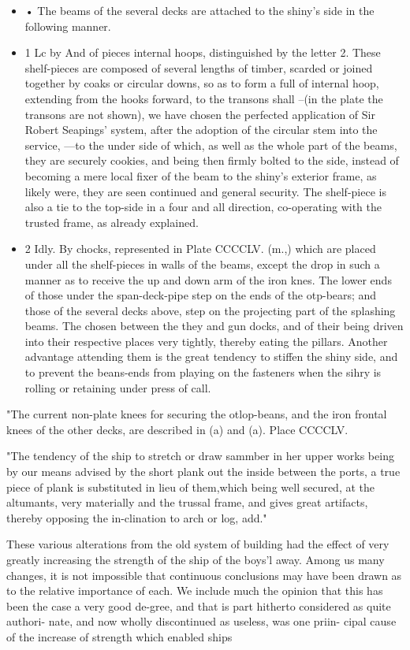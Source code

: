 \documentclass{article}
\begin{document}
\begin{itemize}
\item • The beams of the several decks are attached to the shiny’s side in the following manner.
\item 1 Lc by And of pieces internal hoops, distinguished by the letter 2. These shelf-pieces are composed of several lengths of timber, scarded or joined together by coaks or circular downs, so as to form a full of internal hoop, extending from the hooks forward, to the transons shall --(in the plate the transons are not shown), we have chosen the perfected application of Sir Robert Seapings’ system, after the adoption of the circular stem into the service, —to the under side of which, as well as the whole part of the beams, they are securely cookies, and being then firmly bolted to the side, instead of becoming a mere local fixer of the beam to the shiny’s exterior frame, as likely were, they are seen continued and general security. The shelf-piece is also a tie to the top-side in a four and all direction, co-operating with the trusted frame, as already explained.
\item 2 Idly. By chocks, represented in Plate CCCCLV. (m.,) which are placed under all the shelf-pieces in walls of the beams, except the drop in such a manner as to receive the up and down arm of the iron knes. The lower ends of those under the span-deck-pipe step on the ends of the otp-bears; and those of the several decks above, step on the projecting part of the splashing beams. The chosen between the they and gun docks, and of their being driven into their respective places very tightly, thereby eating the pillars. Another advantage attending them is the great tendency to stiffen the shiny side, and to prevent the beans-ends from playing on the fasteners when the sihry is rolling or retaining under press of call.
\end{itemize}
"The current non-plate knees for securing the otlop-beans, and the iron frontal knees of the other decks, are described in (a) and (a). Place CCCCLV.

"The tendency of the ship to stretch or draw sammber in her upper works being by our means advised by the short plank out the inside between the ports, a true piece of plank is substituted in lieu of them,which being well secured, at the altumants, very materially and the trussal frame, and gives great artifacts, thereby opposing the in-clination to arch or log, add."

These various alterations from the old system of building had the effect of very greatly increasing the strength of the ship of the boys'l away. Among us many changes, it is not impossible that continuous conclusions may have been drawn as to the relative importance of each. We include much the opinion that this has been the case a very good de-gree, and that is part hitherto considered as quite authori- nate, and now wholly discontinued as useless, was one priin- cipal cause of the increase of strength which enabled ships
\end{document}

